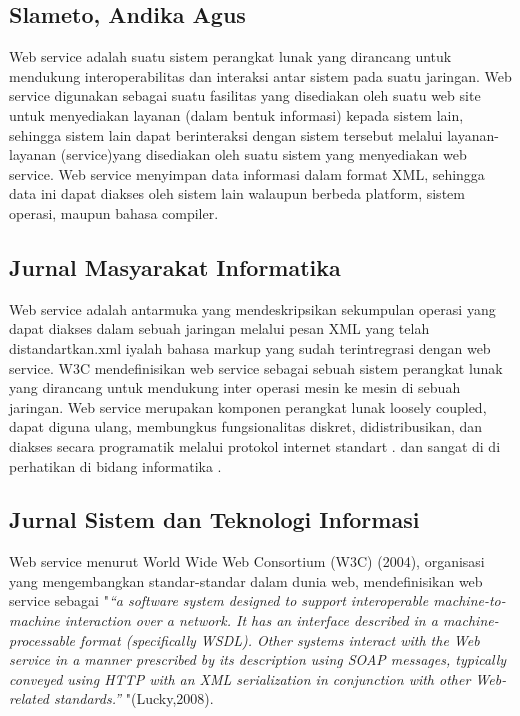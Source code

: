 \subsection{Slameto, Andika Agus}

	Web service adalah suatu sistem perangkat lunak yang dirancang untuk mendukung interoperabilitas dan interaksi antar sistem pada suatu jaringan. Web service digunakan sebagai suatu fasilitas yang disediakan oleh suatu web site untuk menyediakan layanan (dalam bentuk informasi) kepada sistem lain, sehingga sistem lain dapat berinteraksi dengan sistem tersebut melalui layanan-layanan (service)yang disediakan oleh suatu sistem yang menyediakan web service. Web service menyimpan data informasi dalam format XML, sehingga data ini dapat diakses oleh sistem lain walaupun berbeda platform, sistem operasi, maupun bahasa compiler\cite{slameto2015penerapan}.

\subsection{Jurnal Masyarakat Informatika}

	Web service adalah antarmuka yang mendeskripsikan sekumpulan operasi yang dapat diakses dalam sebuah jaringan melalui pesan XML yang telah distandartkan.xml iyalah bahasa markup yang sudah terintregrasi dengan web service. W3C mendefinisikan web service sebagai sebuah sistem perangkat lunak yang dirancang untuk mendukung inter operasi mesin ke mesin di sebuah jaringan.  Web service merupakan komponen perangkat lunak loosely coupled, dapat diguna ulang, membungkus fungsionalitas diskret, didistribusikan, dan diakses secara programatik melalui protokol internet standart . dan sangat di di perhatikan di bidang informatika \cite{saputra2integrasi}.

\subsection{Jurnal Sistem dan Teknologi Informasi}

	Web service menurut World Wide Web Consortium (W3C) (2004), organisasi yang mengembangkan standar-standar dalam dunia web, mendefinisikan web service sebagai "\textit{“a software system designed to support interoperable machine-to-machine interaction over a network. It has an interface described in a machine-processable format (specifically WSDL). Other systems interact with the Web service in a manner prescribed by its description using SOAP messages, typically conveyed using HTTP with an XML serialization in conjunction with other Web-related standards.” }"(Lucky,2008).

